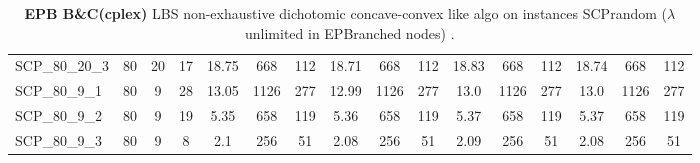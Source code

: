 \begin{sidewaystable}[!ht]
{\begin{tabular}{lccccccccccccccc}
SCP\_80\_20\_3 & 80 & 20 & 17 & 18.75 & 668 & 112 &  \textcolor{blue2}{18.71} & 668 & 112 & 18.83 & 668 & 112 & 18.74 & 668 & 112 \\
SCP\_80\_9\_1 & 80 & 9 & 28 & 13.05 & 1126 & 277 &  \textcolor{blue2}{12.99} & 1126 & 277 & 13.0 & 1126 & 277 & 13.0 & 1126 & 277 \\
SCP\_80\_9\_2 & 80 & 9 & 19 &  \textcolor{blue2}{5.35} & 658 & 119 & 5.36 & 658 & 119 & 5.37 & 658 & 119 & 5.37 & 658 & 119 \\
SCP\_80\_9\_3 & 80 & 9 & 8 & 2.1 & 256 & 51 &  \textcolor{blue2}{2.08} & 256 & 51 & 2.09 & 256 & 51 &  \textcolor{blue2}{2.08} & 256 & 51 \\
\bottomrule
\end{tabular}
}%
\caption{\textbf{EPB B\&C(cplex) }LBS non-exhaustive dichotomic concave-convex like algo on instances SCPrandom ($\lambda$ unlimited in EPBranched nodes) .}
\label{tab:table2_lambda_EPB_SCPrandom }
\end{sidewaystable}

